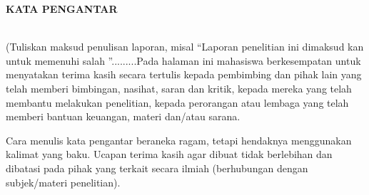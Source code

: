 \clearpage

\normalsize \bfseries \centering \MakeUppercase{Kata Pengantar}
% 
\thispagestyle{fancy}
\fancyhf{}
\fancyhead[R]{\thepage}
\\[2\baselineskip]

\normalsize \normalfont \justifying
(Tuliskan maksud penulisan laporan, misal “Laporan penelitian ini dimaksud kan untuk memenuhi salah ”.........Pada halaman ini mahasiswa berkesempatan untuk menyatakan terima kasih secara tertulis kepada pembimbing dan pihak lain yang telah memberi bimbingan, nasihat, saran dan kritik, kepada mereka yang telah membantu melakukan penelitian, kepada perorangan atau lembaga yang telah memberi bantuan keuangan, materi dan/atau sarana.

Cara menulis kata pengantar beraneka ragam, tetapi hendaknya menggunakan kalimat yang baku. Ucapan terima kasih agar dibuat tidak berlebihan dan dibatasi pada pihak yang terkait secara ilmiah (berhubungan dengan subjek/materi penelitian). 


\clearpage
